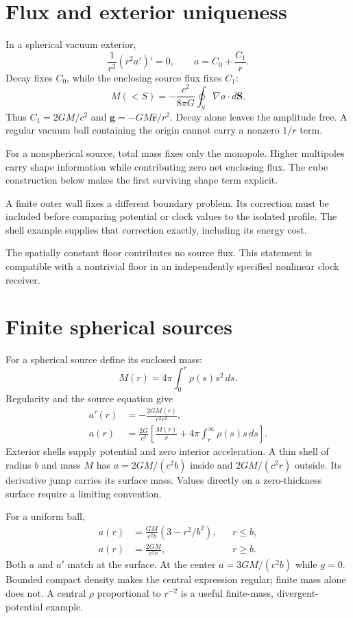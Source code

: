 \documentclass[10pt,twocolumn,letterpaper]{article}
\begin{document}
\section{Flux and exterior uniqueness}
In a spherical vacuum exterior,
\[
\frac{1}{r^2}(r^2a')'=0,\qquad a=C_0+\frac{C_1}{r}.
\]
Decay fixes $C_0$, while the enclosing source flux fixes $C_1$:
\[
M(<S)=-\frac{c^2}{8\pi G}\oint_S\nabla a\cdot d\mathbf S.
\]
Thus $C_1=2GM/c^2$ and $\mathbf g=-GM\hat{\mathbf r}/r^2$. Decay alone leaves the amplitude free. A regular vacuum ball containing the origin cannot carry a nonzero $1/r$ term.

For a nonspherical source, total mass fixes only the monopole. Higher multipoles carry shape information while contributing zero net enclosing flux. The cube construction below makes the first surviving shape term explicit.

A finite outer wall fixes a different boundary problem. Its correction must be included before comparing potential or clock values to the isolated profile. The shell example supplies that correction exactly, including its energy cost.

The spatially constant floor contributes no source flux. This statement is compatible with a nontrivial floor in an independently specified nonlinear clock receiver.

\section{Finite spherical sources}
For a spherical source define its enclosed mass:
\[
M(r)=4\pi\int_0^r\rho(s)s^2\,ds.
\]
Regularity and the source equation give
\[
\begin{aligned}
a'(r)&=-\frac{2GM(r)}{c^2r^2},\\
a(r)&=\frac{2G}{c^2}\left[\frac{M(r)}{r}+4\pi\int_r^\infty\rho(s)s\,ds\right].
\end{aligned}
\]
Exterior shells supply potential and zero interior acceleration. A thin shell of radius $b$ and mass $M$ has $a=2GM/(c^2b)$ inside and $2GM/(c^2r)$ outside. Its derivative jump carries its surface mass. Values directly on a zero-thickness surface require a limiting convention.

For a uniform ball,
\[
\begin{aligned}
a(r)&=\frac{GM}{c^2b}(3-r^2/b^2),&&r\leq b,\\
a(r)&=\frac{2GM}{c^2r},&&r\geq b.
\end{aligned}
\]
Both $a$ and $a'$ match at the surface. At the center $a=3GM/(c^2b)$ while $g=0$. Bounded compact density makes the central expression regular; finite mass alone does not. A central $\rho$ proportional to $r^{-2}$ is a useful finite-mass, divergent-potential example.
\end{document}
